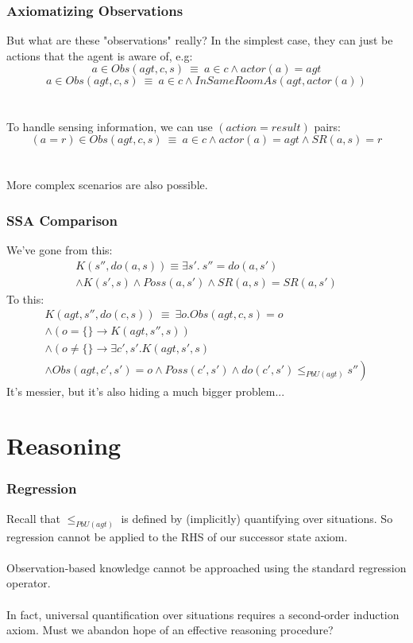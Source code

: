 \documentclass{beamer}
\begin{document}
\begin{frame}
\frametitle{Axiomatizing Observations}
But what are these "observations" really?  In the simplest case, they
can just be actions that the agent is aware of, e.g:
\begin{equation*}
a \in Obs(agt,c,s)\ \equiv\ a \in c \wedge actor(a) = agt
\end{equation*}
\begin{equation*}
a \in Obs(agt,c,s)\ \equiv\ a \in c \wedge InSameRoomAs(agt,actor(a))
\end{equation*}
\ \\
\ \\
\pause
To handle sensing information, we can use $(action = result)$ pairs:
\begin{equation*}
(a=r) \in Obs(agt,c,s)\ \equiv\ a \in c \wedge actor(a) = agt \wedge SR(a,s) = r
\end{equation*}
\ \\
\ \\
More complex scenarios are also possible.
\end{frame}

\begin{frame}
\frametitle{SSA Comparison}
We've gone from this:
\begin{multline*}
 K(s'',do(a,s)) \equiv \exists s' . \ s''=do(a,s') \\
 \wedge K(s',s) \wedge Poss(a,s') \wedge SR(a,s) = SR(a,s')
\end{multline*}
\pause
To this:
\begin{multline*}
  K(agt,s'',do(c,s))\ \equiv\ \exists o . Obs(agt,c,s) = o  \\
  \wedge \left(o = \{\} \rightarrow K(agt,s'',s)\right) \\
  \wedge \left(o \neq \{\} \rightarrow \exists c',s' . K(agt,s',s)\right. \\
  \left.\wedge Obs(agt,c',s') = o \wedge Poss(c',s') \wedge do(c',s') \leq_{PbU(agt)} s''\right)
\end{multline*}
\pause
It's messier, but it's also hiding a much bigger problem...
\end{frame}

\section{Reasoning}

\begin{frame}
\frametitle{Regression}
Recall that $\leq_{PbU(agt)}$ is defined by (implicitly) quantifying over
situations. So regression cannot be applied to the RHS of our successor state
axiom.
\ \\
\ \\
Observation-based knowledge \alert{cannot} be approached using
the standard regression operator.
\ \\
\ \\
\pause
In fact, universal quantification over situations requires a
second-order induction axiom.
Must we abandon hope of an effective reasoning procedure?
\end{frame}
\end{document}

